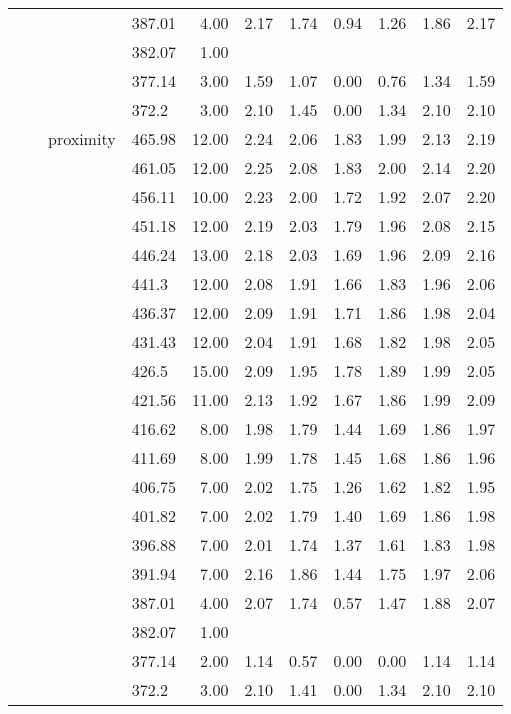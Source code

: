 \begin{longtable}{llllrrrrrrr}
   &  &  & 387.01 & 4.00 & 2.17 & 1.74 & 0.94 & 1.26 & 1.86 & 2.17 \\ 
   &  &  & 382.07 & 1.00 &  &  &  &  &  &  \\ 
   &  &  & 377.14 & 3.00 & 1.59 & 1.07 & 0.00 & 0.76 & 1.34 & 1.59 \\ 
   &  &  & 372.2 & 3.00 & 2.10 & 1.45 & 0.00 & 1.34 & 2.10 & 2.10 \\ 
   &  & proximity & 465.98 & 12.00 & 2.24 & 2.06 & 1.83 & 1.99 & 2.13 & 2.19 \\ 
   &  &  & 461.05 & 12.00 & 2.25 & 2.08 & 1.83 & 2.00 & 2.14 & 2.20 \\ 
   &  &  & 456.11 & 10.00 & 2.23 & 2.00 & 1.72 & 1.92 & 2.07 & 2.20 \\ 
   &  &  & 451.18 & 12.00 & 2.19 & 2.03 & 1.79 & 1.96 & 2.08 & 2.15 \\ 
   &  &  & 446.24 & 13.00 & 2.18 & 2.03 & 1.69 & 1.96 & 2.09 & 2.16 \\ 
   &  &  & 441.3 & 12.00 & 2.08 & 1.91 & 1.66 & 1.83 & 1.96 & 2.06 \\ 
   &  &  & 436.37 & 12.00 & 2.09 & 1.91 & 1.71 & 1.86 & 1.98 & 2.04 \\ 
   &  &  & 431.43 & 12.00 & 2.04 & 1.91 & 1.68 & 1.82 & 1.98 & 2.05 \\ 
   &  &  & 426.5 & 15.00 & 2.09 & 1.95 & 1.78 & 1.89 & 1.99 & 2.05 \\ 
   &  &  & 421.56 & 11.00 & 2.13 & 1.92 & 1.67 & 1.86 & 1.99 & 2.09 \\ 
   &  &  & 416.62 & 8.00 & 1.98 & 1.79 & 1.44 & 1.69 & 1.86 & 1.97 \\ 
   &  &  & 411.69 & 8.00 & 1.99 & 1.78 & 1.45 & 1.68 & 1.86 & 1.96 \\ 
   &  &  & 406.75 & 7.00 & 2.02 & 1.75 & 1.26 & 1.62 & 1.82 & 1.95 \\ 
   &  &  & 401.82 & 7.00 & 2.02 & 1.79 & 1.40 & 1.69 & 1.86 & 1.98 \\ 
   &  &  & 396.88 & 7.00 & 2.01 & 1.74 & 1.37 & 1.61 & 1.83 & 1.98 \\ 
   &  &  & 391.94 & 7.00 & 2.16 & 1.86 & 1.44 & 1.75 & 1.97 & 2.06 \\ 
   &  &  & 387.01 & 4.00 & 2.07 & 1.74 & 0.57 & 1.47 & 1.88 & 2.07 \\ 
   &  &  & 382.07 & 1.00 &  &  &  &  &  &  \\ 
   &  &  & 377.14 & 2.00 & 1.14 & 0.57 & 0.00 & 0.00 & 1.14 & 1.14 \\ 
   &  &  & 372.2 & 3.00 & 2.10 & 1.41 & 0.00 & 1.34 & 2.10 & 2.10 \\ 

\end{longtable}
